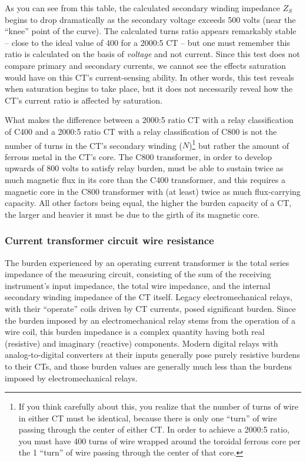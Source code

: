 As you can see from this table, the calculated secondary winding impedance $Z_S$ begins to drop dramatically as the secondary voltage exceeds 500 volts (near the ``knee'' point of the curve).  The calculated turns ratio appears remarkably stable -- close to the ideal value of 400 for a 2000:5 CT -- but one must remember this ratio is calculated on the basis of \textit{voltage} and not current.  Since this test does not compare primary and secondary currents, we cannot see the effects saturation would have on this CT's current-sensing ability.  In other words, this test reveals when saturation begins to take place, but it does not necessarily reveal how the CT's current ratio is affected by saturation.

\vskip 10pt

What makes the difference between a 2000:5 ratio CT with a relay classification of C400 and a 2000:5 ratio CT with a relay classification of C800 is not the number of turns in the CT's secondary winding ($N$)\footnote{If you think carefully about this, you realize that the number of turns of wire in either CT must be identical, because there is only one ``turn'' of wire passing through the center of either CT.  In order to achieve a 2000:5 ratio, you must have 400 turns of wire wrapped around the toroidal ferrous core per the 1 ``turn'' of wire passing through the center of that core.} but rather the amount of ferrous metal in the CT's core.  The C800 transformer, in order to develop upwards of 800 volts to satisfy relay burden, must be able to sustain twice as much magnetic flux in its core than the C400 transformer, and this requires a magnetic core in the C800 transformer with (at least) twice as much flux-carrying capacity.  All other factors being equal, the higher the burden capacity of a CT, the larger and heavier it must be due to the girth of its magnetic core.











\filbreak
\subsubsection{Current transformer circuit wire resistance}

The burden experienced by an operating current transformer is the total series impedance of the measuring circuit, consisting of the sum of the receiving instrument's input impedance, the total wire impedance, and the internal secondary winding impedance of the CT itself.  Legacy electromechanical relays, with their ``operate'' coils driven by CT currents, posed significant burden.  Since the burden imposed by an electromechanical relay stems from the operation of a wire coil, this burden impedance is a complex quantity having both real (resistive) and imaginary (reactive) components.  Modern digital relays with analog-to-digital converters at their inputs generally pose purely resistive burdens to their CTs, and those burden values are generally much less than the burdens imposed by electromechanical relays.  

